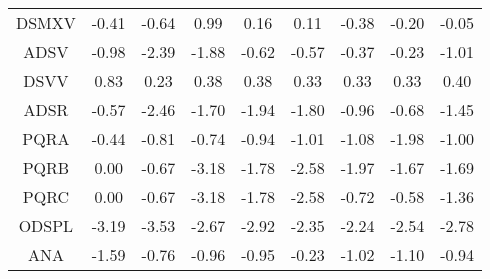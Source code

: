 \documentclass[11pt,a4paper]{report}
\begin{document}
\begin{centering}
\begin{longtable}{ | c || c | c | c | c | c | c | c || c |}
DSMXV &  \cellcolor[HTML]{FFF7F7} -0.41 &  \cellcolor[HTML]{FFEFEF} -0.64 &  \cellcolor[HTML]{E7E7FF} 0.99 &  \cellcolor[HTML]{F7F7FF} 0.16 &  \cellcolor[HTML]{FFFFFF} 0.11 &  \cellcolor[HTML]{FFF7F7} -0.38 &  \cellcolor[HTML]{FFF7F7} -0.20 &  \cellcolor[HTML]{FFFFFF} -0.05 \\
ADSV &  \cellcolor[HTML]{FFE7E7} -0.98 &  \cellcolor[HTML]{FFBFBF} -2.39 &  \cellcolor[HTML]{FFCFCF} -1.88 &  \cellcolor[HTML]{FFEFEF} -0.62 &  \cellcolor[HTML]{FFEFEF} -0.57 &  \cellcolor[HTML]{FFF7F7} -0.37 &  \cellcolor[HTML]{FFF7F7} -0.23 &  \cellcolor[HTML]{FFE7E7} -1.01 \\
DSVV &  \cellcolor[HTML]{E7E7FF} 0.83 &  \cellcolor[HTML]{F7F7FF} 0.23 &  \cellcolor[HTML]{F7F7FF} 0.38 &  \cellcolor[HTML]{F7F7FF} 0.38 &  \cellcolor[HTML]{F7F7FF} 0.33 &  \cellcolor[HTML]{F7F7FF} 0.33 &  \cellcolor[HTML]{F7F7FF} 0.33 &  \cellcolor[HTML]{F7F7FF} 0.40 \\
ADSR &  \cellcolor[HTML]{FFEFEF} -0.57 &  \cellcolor[HTML]{FFBFBF} -2.46 &  \cellcolor[HTML]{FFD7D7} -1.70 &  \cellcolor[HTML]{FFCFCF} -1.94 &  \cellcolor[HTML]{FFCFCF} -1.80 &  \cellcolor[HTML]{FFE7E7} -0.96 &  \cellcolor[HTML]{FFEFEF} -0.68 &  \cellcolor[HTML]{FFD7D7} -1.45 \\
PQRA &  \cellcolor[HTML]{FFF7F7} -0.44 &  \cellcolor[HTML]{FFE7E7} -0.81 &  \cellcolor[HTML]{FFEFEF} -0.74 &  \cellcolor[HTML]{FFE7E7} -0.94 &  \cellcolor[HTML]{FFE7E7} -1.01 &  \cellcolor[HTML]{FFE7E7} -1.08 &  \cellcolor[HTML]{FFCFCF} -1.98 &  \cellcolor[HTML]{FFE7E7} -1.00 \\
PQRB &  \cellcolor[HTML]{FFFFFF} 0.00 &  \cellcolor[HTML]{FFEFEF} -0.67 &  \cellcolor[HTML]{FFAFAF} -3.18 &  \cellcolor[HTML]{FFCFCF} -1.78 &  \cellcolor[HTML]{FFBFBF} -2.58 &  \cellcolor[HTML]{FFCFCF} -1.97 &  \cellcolor[HTML]{FFD7D7} -1.67 &  \cellcolor[HTML]{FFD7D7} -1.69 \\
PQRC &  \cellcolor[HTML]{FFFFFF} 0.00 &  \cellcolor[HTML]{FFEFEF} -0.67 &  \cellcolor[HTML]{FFAFAF} -3.18 &  \cellcolor[HTML]{FFCFCF} -1.78 &  \cellcolor[HTML]{FFBFBF} -2.58 &  \cellcolor[HTML]{FFEFEF} -0.72 &  \cellcolor[HTML]{FFEFEF} -0.58 &  \cellcolor[HTML]{FFDFDF} -1.36 \\
ODSPL &  \cellcolor[HTML]{FFAFAF} -3.19 &  \cellcolor[HTML]{FFA7A7} -3.53 &  \cellcolor[HTML]{FFBFBF} -2.67 &  \cellcolor[HTML]{FFB7B7} -2.92 &  \cellcolor[HTML]{FFC7C7} -2.35 &  \cellcolor[HTML]{FFC7C7} -2.24 &  \cellcolor[HTML]{FFBFBF} -2.54 &  \cellcolor[HTML]{FFB7B7} -2.78 \\
ANA &  \cellcolor[HTML]{FFD7D7} -1.59 &  \cellcolor[HTML]{FFEFEF} -0.76 &  \cellcolor[HTML]{FFE7E7} -0.96 &  \cellcolor[HTML]{FFE7E7} -0.95 &  \cellcolor[HTML]{FFF7F7} -0.23 &  \cellcolor[HTML]{FFE7E7} -1.02 &  \cellcolor[HTML]{FFE7E7} -1.10 &  \cellcolor[HTML]{FFE7E7} -0.94 \\

\end{longtable}
\end{centering}
\end{document}
